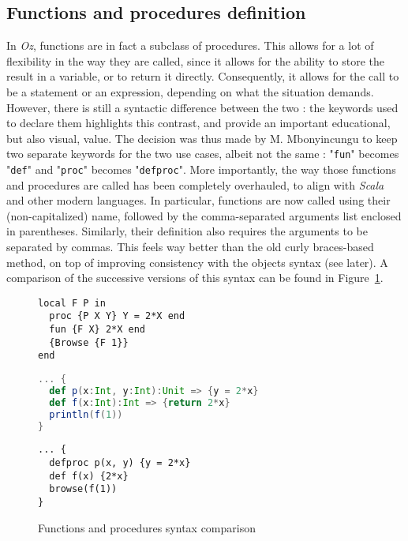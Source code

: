 \subsection{Functions and procedures definition}
In \textit{Oz}, functions are in fact a subclass of procedures.
This allows for a lot of flexibility in the way they are called, since it allows for the ability to store the result in a variable, or to return it directly.
Consequently, it allows for the call to be a statement or an expression, depending on what the situation demands.\newline
However, there is still a syntactic difference between the two : the keywords used to declare them highlights this contrast, and provide an important educational, but also visual, value.
The decision was thus made by M. Mbonyincungu to keep two separate keywords for the two use cases, albeit not the same : "\texttt{fun}" becomes "\texttt{def}" and "\texttt{proc}" becomes "\texttt{defproc}".\newline
More importantly, the way those functions and procedures are called has been completely overhauled, to align with \textit{Scala} and other modern languages.
In particular, functions are now called using their (non-capitalized) name, followed by the comma-separated arguments list enclosed in parentheses.
Similarly, their definition also requires the arguments to be separated by commas.
This feels way better than the old curly braces-based method, on top of improving consistency with the objects syntax (see later).\newline
A comparison of the successive versions of this syntax can be found in Figure~\ref{fig:code-comp-fun}.
\begin{figure}
    \noindent\begin{minipage}{.49\textwidth}
\begin{lstlisting}[title={Oz},language=oz]
local F P in
  proc {P X Y} Y = 2*X end
  fun {F X} 2*X end
  {Browse {F 1}}
end
\end{lstlisting}
    \end{minipage}
    \hfill
    \noindent\begin{minipage}{.49\textwidth}
\begin{lstlisting}[title={Scala/Ozma},language=scala]
... {
  def p(x:Int, y:Int):Unit => {y = 2*x}
  def f(x:Int):Int => {return 2*x}
  println(f(1))
}
\end{lstlisting}
    \end{minipage}
    \begin{center}
    \noindent\begin{minipage}{.89\textwidth}
\begin{lstlisting}[title={NewOz 2020/2021},language=newoz]
... {
  defproc p(x, y) {y = 2*x}
  def f(x) {2*x}
  browse(f(1))
}
\end{lstlisting}
    \end{minipage}
    \end{center}
\caption{Functions and procedures syntax comparison}
\label{fig:code-comp-fun}
\end{figure}

